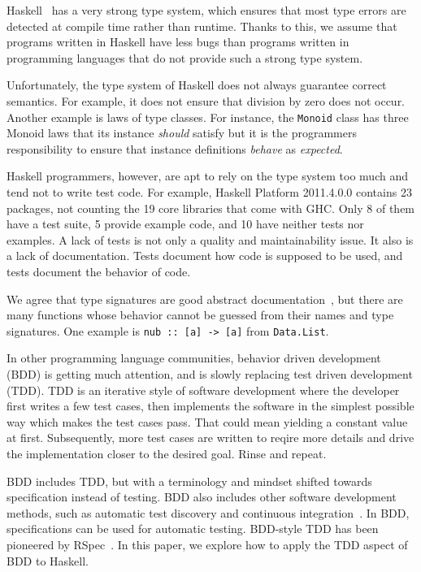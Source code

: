 \documentclass[preprint]{sigplanconf}
\begin{document}
Haskell~\cite{haskell} has a very strong type system, which ensures that most type errors are
detected at compile time rather than runtime.  Thanks to this, we assume that
programs written in Haskell have less bugs than programs written in programming
languages that do not provide such a strong type system.

Unfortunately, the type system of Haskell does not always guarantee
correct semantics.
For example, it does not ensure that division by zero does not occur.
Another example is laws of type classes.
For instance, the {\tt Monoid} class has three Monoid laws
that its instance \emph{should} satisfy
but
it is the programmers responsibility to ensure that
instance definitions \emph{behave} as \emph{expected}.

Haskell programmers, however, are apt to rely on the type system too
much and tend not to write test code.  For example, Haskell
Platform 2011.4.0.0 contains 23 packages, not counting the 19 core
libraries that come with GHC.  Only 8 of them have a test suite, 5
provide example code, and 10 have neither tests nor examples.
A lack of tests is not only a quality and maintainability issue.  It
also is a lack of documentation.  Tests document how code is supposed
to be used, and tests document the behavior of code.

We agree that type signatures are good abstract documentation~\cite{free}, but
there are many functions whose behavior cannot be guessed from their names and
type signatures.  One example is \verb|nub :: [a] -> [a]| from {\tt Data.List}.

In other programming language communities, behavior driven development
(BDD) is getting much attention, and is slowly replacing test driven
development (TDD).  TDD is an iterative style of software development
where the developer first writes a few test cases, then implements the
software in the simplest possible way which makes the test cases pass.
That could mean yielding a constant value at first.  Subsequently,
more test cases are written to reqire more details and drive the
implementation closer to the desired goal.  Rinse and repeat.  

BDD includes TDD, but with a terminology and mindset shifted towards
specification instead of testing. BDD also includes other software
development methods, such as automatic test discovery and continuous
integration~\cite{ci}.  In BDD, specifications can be used for
automatic testing.  BDD-style TDD has been pioneered by
RSpec~\cite{rspec}.  In this paper, we explore how to apply the TDD
aspect of BDD to Haskell.
\end{document}
